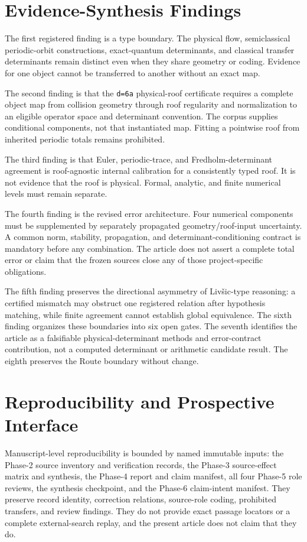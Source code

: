 \documentclass[11pt,a4paper]{article}
\begin{document}
\section{Evidence-Synthesis Findings}

The first registered finding is a type boundary. The physical flow, semiclassical periodic-orbit constructions, exact-quantum determinants, and classical transfer determinants remain distinct even when they share geometry or coding. Evidence for one object cannot be transferred to another without an exact map.

The second finding is that the \texttt{d=6a} physical-roof certificate requires a complete object map from collision geometry through roof regularity and normalization to an eligible operator space and determinant convention. The corpus supplies conditional components, not that instantiated map. Fitting a pointwise roof from inherited periodic totals remains prohibited.

The third finding is that Euler, periodic-trace, and Fredholm-determinant agreement is roof-agnostic internal calibration for a consistently typed roof. It is not evidence that the roof is physical. Formal, analytic, and finite numerical levels must remain separate.

The fourth finding is the revised error architecture. Four numerical components must be supplemented by separately propagated geometry/roof-input uncertainty. A common norm, stability, propagation, and determinant-conditioning contract is mandatory before any combination. The article does not assert a complete total error or claim that the frozen sources close any of those project-specific obligations.

The fifth finding preserves the directional asymmetry of Livšic-type reasoning: a certified mismatch may obstruct one registered relation after hypothesis matching, while finite agreement cannot establish global equivalence. The sixth finding organizes these boundaries into six open gates. The seventh identifies the article as a falsifiable physical-determinant methods and error-contract contribution, not a computed determinant or arithmetic candidate result. The eighth preserves the Route boundary without change.

\section{Reproducibility and Prospective Interface}

Manuscript-level reproducibility is bounded by named immutable inputs: the Phase-2 source inventory and verification records, the Phase-3 source-effect matrix and synthesis, the Phase-4 report and claim manifest, all four Phase-5 role reviews, the synthesis checkpoint, and the Phase-6 claim-intent manifest. They preserve record identity, correction relations, source-role coding, prohibited transfers, and review findings. They do not provide exact passage locators or a complete external-search replay, and the present article does not claim that they do.
\end{document}
